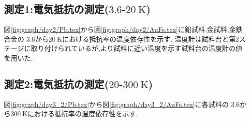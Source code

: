 \subsection{測定1:電気抵抗の測定($3.6$-$20\ \si{\kelvin}$)}
図\ref{fig:graph/day2/Pb.tex}から図\ref{fig:graph/day2/AuFe.tex}に鉛試料,金試料,金鉄合金の
$3.6$から$20\ \si{\kelvin}$における抵抗率の温度依存性を示す.
温度計は試料台と第2ステージに取り付けられているが,より試料に近い温度を示す試料台の温度計の値を用いた.
\clearpage
\subsection{測定2:電気抵抗の測定($20$-$300\ \si{\kelvin}$)}
図\ref{fig:graph/day3_2/Pb.tex}から図\ref{fig:graph/day3_2/AuFe.tex}に各試料の
$3.6$から$300\ \si{\kelvin}$における抵抗率の温度依存性を示す.
